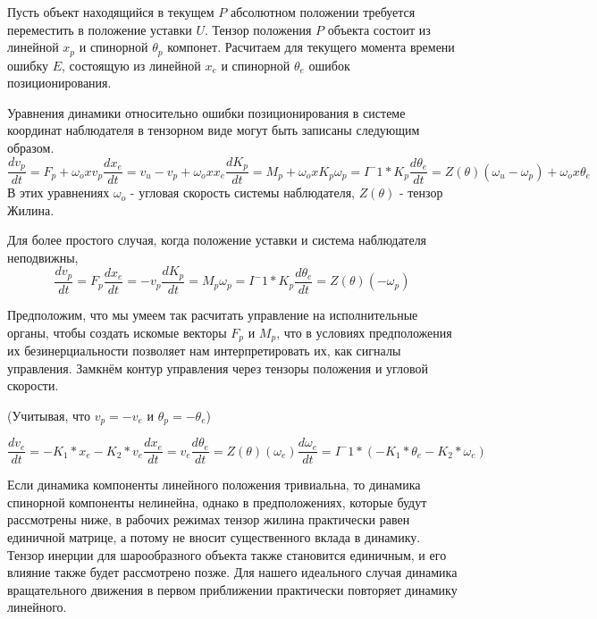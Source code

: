 \documentclass[a4paper]{article}
\begin{document}
Пусть объект находящийся в текущем $P$ абсолютном положении требуется переместить в положение уставки $U$.
Тензор положения $P$ объекта состоит из линейной $x_p$ и спинорной $\theta_p$ компонет. Расчитаем для текущего момента времени ошибку $E$, состоящую из линейной $x_e$ и спинорной $\theta_e$ ошибок позиционирования.

Уравнения динамики относительно ошибки позиционирования в системе координат наблюдателя в тензорном виде могут быть записаны следующим образом.
\begin{equation}
\frac{dv_p}{dt} = F_p  + \omega_o x v_p
\frac{dx_e}{dt} = v_u - v_p + \omega_o x x_e

\frac{dK_p}{dt} = M_p + \omega_o x K_p
\omega_p = I^-1 * K_p
\frac{d\theta_e}{dt} = Z(\theta)(\omega_u - \omega_p) + \omega_o x \theta_e
\end{equation}
В этих уравнениях $\omega_o$ - угловая скорость системы наблюдателя, $Z(\theta)$ - тензор Жилина. 

Для более простого случая, когда положение уставки и система наблюдателя неподвижны,   
\begin{equation}
\frac{dv_p}{dt} = F_p
\frac{dx_e}{dt} = - v_p

\frac{dK_p}{dt} = M_p
\omega_p = I^-1 * K_p
\frac{d\theta_e}{dt} = Z(\theta)(- \omega_p)
\end{equation}

Предположим, что мы умеем так расчитать управление на исполнительные органы, чтобы создать искомые векторы $F_p$ и $M_p$, что в условиях предположения их безинерциальности позволяет нам интерпретировать их, как сигналы управления. Замкнём контур управления через тензоры положения и угловой скорости.

(Учитывая, что $v_p = -v_e$ и $\theta_p = -\theta_e$)

 \begin{equation}
\frac{dv_e}{dt} = -K_1*x_e -K_2*v_e
\frac{dx_e}{dt} = v_e

\frac{d\theta_e}{dt} = Z(\theta)(\omega_e)
\frac{d\omega_e}{dt} = I^-1 * (-K_1*\theta_e -K_2*\omega_e)
\end{equation}

Если динамика компоненты линейного положения тривиальна, то динамика спинорной компоненты нелинейна, однако в предположениях, которые будут рассмотрены ниже, в рабочих режимах тензор жилина практически равен единичной матрице, а потому не вносит существенного вклада в динамику. Тензор инерции для шарообразного объекта также становится единичным, и его влияние также будет рассмотрено позже. Для нашего идеального случая динамика вращательного движения в первом приближении практически повторяет динамику линейного.
\end{document}
